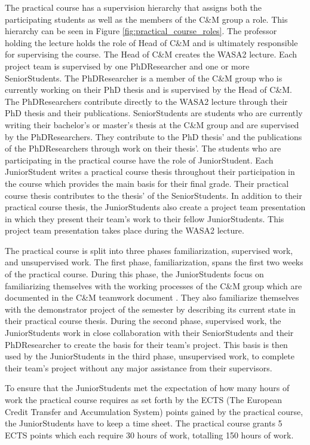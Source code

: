The practical course has a supervision hierarchy that assigns both the participating students
as well as the members of the C\&M group a role. This hierarchy can be seen in Figure \ref{fig:practical_course_roles}.
The professor holding the lecture holds
the role of Head of C\&M and is ultimately responsible for supervising the course.
The Head of C\&M creates the WASA2 lecture.
Each project team is supervised by one PhDResearcher and one or more SeniorStudents.
The PhDResearcher is a member of the C\&M group who is currently working on their PhD thesis and is supervised by the Head of C\&M.
The PhDResearchers contribute directly to the WASA2 lecture through their PhD thesis and their publications.
SeniorStudents are students who are currently writing their bachelor's or master's thesis
at the C\&M group and are supervised by the PhDResearchers. They contribute to the PhD thesis' and the publications of the PhDResearchers
through work on their thesis'.
The students who are participating in the practical course have the role
of JuniorStudent. Each JuniorStudent writes a practical course thesis throughout their participation in the course
which provides the main basis for their final grade. 
Their practical course thesis contributes to the thesis' of the SeniorStudents.
In addition to their practical course thesis, the JuniorStudents also create
a project team presentation in which they present their team's work to their fellow JuniorStudents.
This project team presentation takes place during the WASA2 lecture.

The practical course is split into three phases familiarization, supervised work,
and unsupervised work. The first phase, familiarization, spans the first two weeks of the practical
course. During this phase, the JuniorStudents focus on familiarizing themselves with the working
processes of the C\&M group which are documented in the C\&M teamwork document \cite{CM-W-TEA}.
They also familiarize themselves with the demonstrator project of the semester by describing
its current state in their practical course thesis. During the second phase, supervised work,
the JuniorStudents work in close collaboration with their SeniorStudents and their PhDResearcher
to create the basis for their team's project. This basis is then used
by the JuniorStudents in the third phase, unsupervised work, to complete their team's project
without any major assistance from their supervisors.

To ensure that the JuniorStudents met the expectation of how many hours of work
the practical course requires as set forth by the ECTS (The European Credit Transfer and Accumulation System)
points gained by the practical course, the JuniorStudents have to keep a time sheet.
The practical course grants 5 ECTS points which each require 30 hours of work, totalling 150 hours of work.

